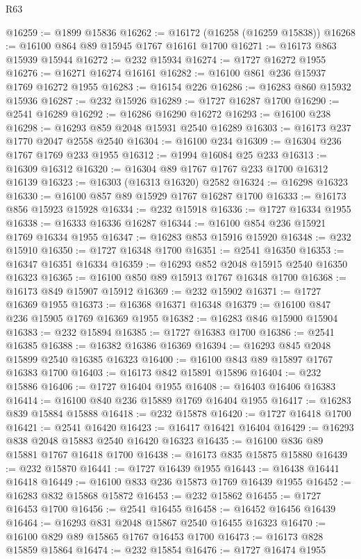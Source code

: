 \begin{lexlean}{R63}
\begin{coremodule}
@16259 := @1899 @15836
@16262 := @16172 (@16258 (@16259 @15838))
@16268 := @16100 @864 @89 @15945 @1767 @16161 @1700
@16271 := @16173 @863 @15939 @15944
@16272 := @232 @15934
@16274 := @1727 @16272 @1955
@16276 := @16271 @16274 @16161
@16282 := @16100 @861 @236 @15937 @1769 @16272 @1955
@16283 := @16154 @226
@16286 := @16283 @860 @15932 @15936
@16287 := @232 @15926
@16289 := @1727 @16287 @1700
@16290 := @2541 @16289
@16292 := @16286 @16290 @16272
@16293 := @16100 @238
@16298 := @16293 @859 @2048 @15931 @2540 @16289
@16303 := @16173 @237 @1770 @2047 @2558 @2540
@16304 := @16100 @234
@16309 := @16304 @236 @1767 @1769 @233 @1955
@16312 := @1994 @16084 @25 @233
@16313 := @16309 @16312
@16320 := @16304 @89 @1767 @1767 @233 @1700 @16312 @16139
@16323 := @16303 (@16313 @16320) @2582
@16324 := @16298 @16323
@16330 := @16100 @857 @89 @15929 @1767 @16287 @1700
@16333 := @16173 @856 @15923 @15928
@16334 := @232 @15918
@16336 := @1727 @16334 @1955
@16338 := @16333 @16336 @16287
@16344 := @16100 @854 @236 @15921 @1769 @16334 @1955
@16347 := @16283 @853 @15916 @15920
@16348 := @232 @15910
@16350 := @1727 @16348 @1700
@16351 := @2541 @16350
@16353 := @16347 @16351 @16334
@16359 := @16293 @852 @2048 @15915 @2540 @16350 @16323
@16365 := @16100 @850 @89 @15913 @1767 @16348 @1700
@16368 := @16173 @849 @15907 @15912
@16369 := @232 @15902
@16371 := @1727 @16369 @1955
@16373 := @16368 @16371 @16348
@16379 := @16100 @847 @236 @15905 @1769 @16369 @1955
@16382 := @16283 @846 @15900 @15904
@16383 := @232 @15894
@16385 := @1727 @16383 @1700
@16386 := @2541 @16385
@16388 := @16382 @16386 @16369
@16394 := @16293 @845 @2048 @15899 @2540 @16385 @16323
@16400 := @16100 @843 @89 @15897 @1767 @16383 @1700
@16403 := @16173 @842 @15891 @15896
@16404 := @232 @15886
@16406 := @1727 @16404 @1955
@16408 := @16403 @16406 @16383
@16414 := @16100 @840 @236 @15889 @1769 @16404 @1955
@16417 := @16283 @839 @15884 @15888
@16418 := @232 @15878
@16420 := @1727 @16418 @1700
@16421 := @2541 @16420
@16423 := @16417 @16421 @16404
@16429 := @16293 @838 @2048 @15883 @2540 @16420 @16323
@16435 := @16100 @836 @89 @15881 @1767 @16418 @1700
@16438 := @16173 @835 @15875 @15880
@16439 := @232 @15870
@16441 := @1727 @16439 @1955
@16443 := @16438 @16441 @16418
@16449 := @16100 @833 @236 @15873 @1769 @16439 @1955
@16452 := @16283 @832 @15868 @15872
@16453 := @232 @15862
@16455 := @1727 @16453 @1700
@16456 := @2541 @16455
@16458 := @16452 @16456 @16439
@16464 := @16293 @831 @2048 @15867 @2540 @16455 @16323
@16470 := @16100 @829 @89 @15865 @1767 @16453 @1700
@16473 := @16173 @828 @15859 @15864
@16474 := @232 @15854
@16476 := @1727 @16474 @1955

\end{coremodule}
\end{lexlean}
